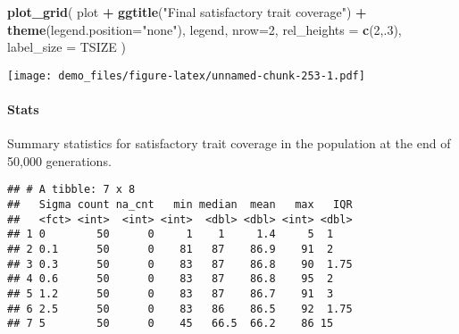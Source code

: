 \documentclass[]{book}
\newenvironment{Shaded}{\begin{snugshade}}{\end{snugshade}}
\newcommand{\DataTypeTok}[1]{\textcolor[rgb]{0.13,0.29,0.53}{#1}}
\newcommand{\DecValTok}[1]{\textcolor[rgb]{0.00,0.00,0.81}{#1}}
\newcommand{\KeywordTok}[1]{\textcolor[rgb]{0.13,0.29,0.53}{\textbf{#1}}}
\newcommand{\NormalTok}[1]{#1}
\newcommand{\OperatorTok}[1]{\textcolor[rgb]{0.81,0.36,0.00}{\textbf{#1}}}
\newcommand{\OtherTok}[1]{\textcolor[rgb]{0.56,0.35,0.01}{#1}}
\newcommand{\StringTok}[1]{\textcolor[rgb]{0.31,0.60,0.02}{#1}}
\let\oldparagraph\paragraph
\renewcommand{\paragraph}[1]{\oldparagraph{#1}\mbox{}}
\begin{document}
\begin{Shaded}
\begin{Highlighting}[]
\KeywordTok{plot_grid}\NormalTok{(}
\NormalTok{  plot }\OperatorTok{+}
\StringTok{    }\KeywordTok{ggtitle}\NormalTok{(}\StringTok{"Final satisfactory trait coverage"}\NormalTok{) }\OperatorTok{+}
\StringTok{    }\KeywordTok{theme}\NormalTok{(}\DataTypeTok{legend.position=}\StringTok{"none"}\NormalTok{),}
\NormalTok{  legend,}
  \DataTypeTok{nrow=}\DecValTok{2}\NormalTok{,}
  \DataTypeTok{rel_heights =} \KeywordTok{c}\NormalTok{(}\DecValTok{2}\NormalTok{,.}\DecValTok{3}\NormalTok{),}
  \DataTypeTok{label_size =}\NormalTok{ TSIZE}
\NormalTok{)}
\end{Highlighting}
\end{Shaded}

\texttt{[image: demo\_files/figure-latex/unnamed-chunk-253-1.pdf]}

\hypertarget{stats-48}{%
\paragraph{Stats}\label{stats-48}}

Summary statistics for satisfactory trait coverage in the population at the end of 50,000 generations.

\begin{Shaded}
\end{Shaded}

\begin{verbatim}
## # A tibble: 7 x 8
##   Sigma count na_cnt   min median  mean   max   IQR
##   <fct> <int>  <int> <int>  <dbl> <dbl> <int> <dbl>
## 1 0        50      0     1    1     1.4     5  1   
## 2 0.1      50      0    81   87    86.9    91  2   
## 3 0.3      50      0    83   87    86.8    90  1.75
## 4 0.6      50      0    83   87    86.8    95  2   
## 5 1.2      50      0    83   87    86.7    91  3   
## 6 2.5      50      0    83   86    86.5    92  1.75
## 7 5        50      0    45   66.5  66.2    86 15
\end{verbatim}
\end{document}
